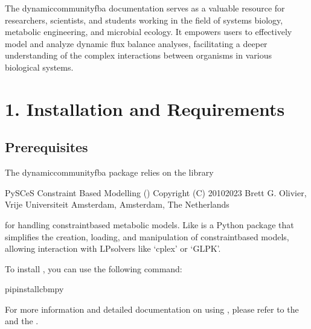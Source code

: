 \documentclass[letterpaper,10pt,english]{sphinxmanual}
\begin{document}
\sphinxAtStartPar
The dynamic\sphinxhyphen{}community\sphinxhyphen{}fba documentation serves as a valuable resource for researchers, scientists, and students working in the field of systems biology, metabolic engineering, and microbial ecology. It empowers users to effectively model and analyze dynamic flux balance analyses, facilitating a deeper understanding of the complex interactions between organisms in various biological systems.

\sphinxstepscope


\chapter{1. Installation and Requirements}
\label{\detokenize{1_installation/home:installation-and-requirements}}\label{\detokenize{1_installation/home::doc}}

\section{Prerequisites}
\label{\detokenize{1_installation/home:prerequisites}}
\sphinxAtStartPar
The dynamic\sphinxhyphen{}community\sphinxhyphen{}fba package relies on the  library %
\begin{footnote}[1]\sphinxAtStartFootnote
PySCeS Constraint Based Modelling () Copyright (C) 2010\sphinxhyphen{}2023 Brett G. Olivier, Vrije Universiteit Amsterdam, Amsterdam, The Netherlands
%
\end{footnote} for handling constraint\sphinxhyphen{}based metabolic models. Like
  is a Python package that simplifies the creation, loading, and manipulation of constraint\sphinxhyphen{}based models, allowing interaction with LP\sphinxhyphen{}solvers like ‘cplex’ or ‘GLPK’.

\sphinxAtStartPar
To install , you can use the following command:

\begin{sphinxVerbatim}[commandchars=\\\{\}]
pipinstallcbmpy
\end{sphinxVerbatim}

\sphinxAtStartPar
For more information and detailed documentation on using , please refer to the  and the .
\end{document}
